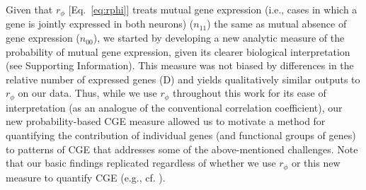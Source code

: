 \documentclass[10pt,letterpaper]{article}
\begin{document}

Given that $r_\phi$ [Eq.~\ref{eq:rphi}] treats mutual gene expression (i.e., cases in which a gene is jointly expressed in both neurons) ($n_{11}$) the same as mutual absence of gene expression ($n_{00}$), we started by developing a new analytic measure of the probability of mutual gene expression, given its clearer biological interpretation (see Supporting Information).
This measure was not biased by differences in the relative number of expressed genes (D) and yields qualitatively similar outputs to $r_\phi$ on our data.
Thus, while we use $r_\phi$ throughout this work for its ease of interpretation (as an analogue of the conventional correlation coefficient), our new probability-based CGE measure allowed us to motivate a method for quantifying the contribution of individual genes (and functional groups of genes) to patterns of CGE that addresses some of the above-mentioned challenges.
Note that our basic findings replicated regardless of whether we use $r_\phi$ or this new measure to quantify CGE (e.g., cf. ).
\end{document}
